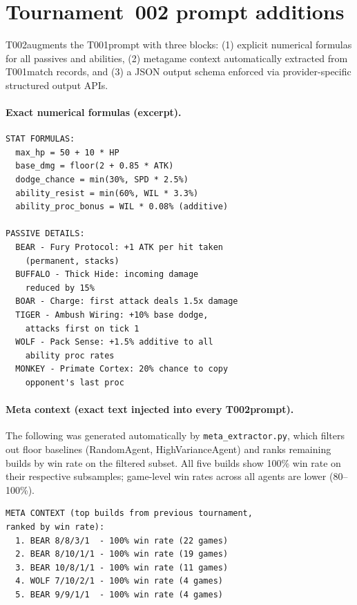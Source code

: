 \documentclass[11pt]{article}
\newcommand{\tOne}{T001}
\newcommand{\tTwo}{T002}
\begin{document}
\section{Tournament~002 prompt additions}\label{app:t2_prompt}

\tTwo augments the \tOne prompt with three blocks: (1) explicit numerical formulas for all passives and abilities, (2) metagame context automatically extracted from \tOne match records, and (3) a JSON output schema enforced via provider-specific structured output APIs.

\paragraph{Exact numerical formulas (excerpt).}
\begingroup
\small
\begin{verbatim}
STAT FORMULAS:
  max_hp = 50 + 10 * HP
  base_dmg = floor(2 + 0.85 * ATK)
  dodge_chance = min(30%, SPD * 2.5%)
  ability_resist = min(60%, WIL * 3.3%)
  ability_proc_bonus = WIL * 0.08% (additive)

PASSIVE DETAILS:
  BEAR - Fury Protocol: +1 ATK per hit taken
    (permanent, stacks)
  BUFFALO - Thick Hide: incoming damage
    reduced by 15%
  BOAR - Charge: first attack deals 1.5x damage
  TIGER - Ambush Wiring: +10% base dodge,
    attacks first on tick 1
  WOLF - Pack Sense: +1.5% additive to all
    ability proc rates
  MONKEY - Primate Cortex: 20% chance to copy
    opponent's last proc
\end{verbatim}
\endgroup

\paragraph{Meta context (exact text injected into every \tTwo prompt).}
The following was generated automatically by \texttt{meta\_extractor.py}, which filters out floor baselines (RandomAgent, HighVarianceAgent) and ranks remaining builds by win rate on the filtered subset.
All five builds show 100\% win rate on their respective subsamples; game-level win rates across all agents are lower (80--100\%).

\begingroup
\small
\begin{verbatim}
META CONTEXT (top builds from previous tournament,
ranked by win rate):
  1. BEAR 8/8/3/1  - 100% win rate (22 games)
  2. BEAR 8/10/1/1 - 100% win rate (19 games)
  3. BEAR 10/8/1/1 - 100% win rate (11 games)
  4. WOLF 7/10/2/1 - 100% win rate (4 games)
  5. BEAR 9/9/1/1  - 100% win rate (4 games)
\end{verbatim}
\endgroup
\end{document}
